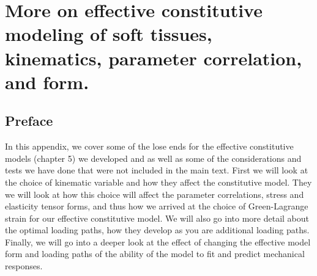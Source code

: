 \chapter{More on effective constitutive modeling of soft tissues, kinematics, parameter correlation, and form.}

\section*{Preface}
%

In this appendix, we cover some of the lose ends for the effective constitutive models (chapter 5) we developed and as well as some of the considerations and tests we have done that were not included in the main text. First we will look at the choice of kinematic variable and how they affect the constitutive model. They we will look at how this choice will affect the parameter correlations, stress and elasticity tensor forms, and thus how we arrived at the choice of Green-Lagrange strain for our effective constitutive model. We will also go into more detail about the optimal loading paths, how they develop as you are additional loading paths. Finally, we will go into a deeper look at the effect of changing the effective model form and loading paths of the ability of the model to fit and predict mechanical responses. 

















